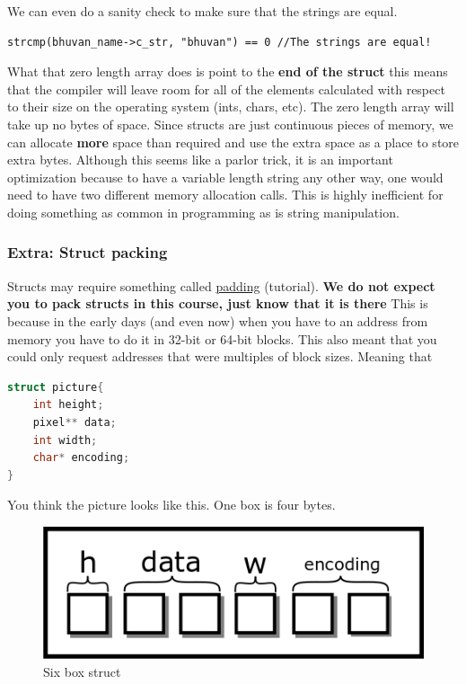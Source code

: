 We can even do a sanity check to make sure that the strings are equal.

\begin{verbatim}
strcmp(bhuvan_name->c_str, "bhuvan") == 0 //The strings are equal!
\end{verbatim}

What that zero length array does is point to the \textbf{end of the struct} this means that the compiler will leave room for all of the elements calculated with respect to their size on the operating system (ints, chars, etc).
The zero length array will take up no bytes of space.
Since structs are just continuous pieces of memory, we can allocate \textbf{more} space than required and use the extra space as a place to store extra bytes.
Although this seems like a parlor trick, it is an important optimization because to have a variable length string any other way, one would need to have two different memory allocation calls.
This is highly inefficient for doing something as common in programming as is string manipulation.

\subsubsection{Extra: Struct packing}

Structs may require something called \href{http://www.catb.org/esr/structure-packing/}{padding} (tutorial).
\textbf{We do not expect you to pack structs in this course, just know that it is there} This is because in the early days (and even now) when you have to an address from memory you have to do it in 32-bit or 64-bit blocks.
This also meant that you could only request addresses that were multiples of block sizes.
Meaning that

\begin{lstlisting}[language=C]
struct picture{
    int height;
    pixel** data;
    int width;
    char* encoding;
}
\end{lstlisting}

You think the picture looks like this.
One box is four bytes.

\begin{figure}[H]
\centering
\includegraphics[width=.7\textwidth]{introc/drawings/struct_clean.png}
\caption{Six box struct}
\label{fig:clean_struct}
\end{figure}

